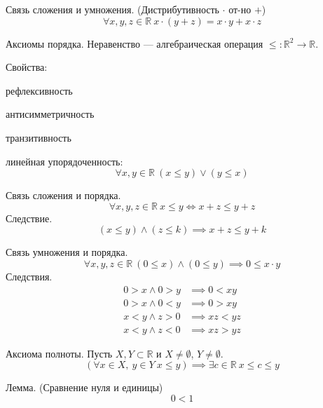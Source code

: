 \begin{theorem}
{\bold Связь сложения и умножения.} {\ital\color{desc} (Дистрибутивность $\cdot$ от-но $+$)}
$$\forall x,y,z\in\mathbb{R}\ x\cdot(y+z)=x\cdot y+x\cdot z$$
\end{theorem}

\begin{theorem}
{\bold Аксиомы порядка.} {\ital Неравенство} --- алгебраическая операция $\leq\colon\mathbb{R}^2\to\mathbb{R}$.

Свойства:
\begin{list*}[][\#]
\item рефлексивность
\item антисимметричность
\item транзитивность
\item {\ital линейная упорядоченность:}
$$\forall x,y\in\mathbb{R}\ (x\leq y)\lor(y\leq x)$$
\end{list*}
\end{theorem}

\begin{theorem}
{\bold Связь сложения и порядка.}
$$\forall x,y,z\in\mathbb{R}\ x\leq y\iff x+z\leq y+z$$
{\bold Следствие.}
$$(x\leq y)\land(z\leq k)\implies x+z\leq y+k$$
\end{theorem}

\begin{theorem}
{\bold Связь умножения и порядка.}
$$\forall x,y,z\in\mathbb{R}\ (0\leq x)\land(0\leq y)\implies 0\leq x\cdot y$$
{\bold Следствия.}
$$\begin{aligned}
0\greater x\land 0\greater y&\implies 0\less xy\\
0\greater x\land 0\less y&\implies 0\greater xy\\
x\less y\land z\greater 0&\implies xz\less yz\\
x\less y\land z\less 0&\implies xz\greater yz
\end{aligned}$$
\end{theorem}

\begin{theorem}
{\bold Аксиома полноты.} Пусть $X,Y\subset\mathbb{R}$ и $X\neq\emptyset$, $Y\neq\emptyset$. 
$$(\forall x\in X,\ y\in Y\ x\leq y)\implies\exists c\in\mathbb{R}\ x\leq c\leq y$$
\end{theorem}

\begin{theorem}
{\bold Лемма.} {\ital\color{desc}(Сравнение нуля и единицы)}
$$0\less 1$$
\end{theorem}

